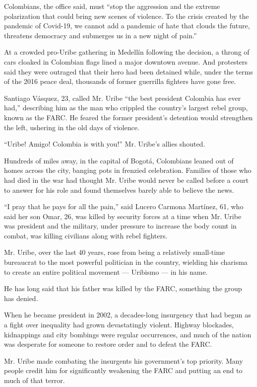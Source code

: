 Colombians, the office said, must ``stop the aggression and the extreme
polarization that could bring new scenes of violence. To the crisis
created by the pandemic of Covid-19, we cannot add a pandemic of hate
that clouds the future, threatens democracy and submerges us in a new
night of pain.''

At a crowded pro-Uribe gathering in Medellín following the decision, a
throng of cars cloaked in Colombian flags lined a major downtown avenue.
And protesters said they were outraged that their hero had been detained
while, under the terms of the 2016 peace deal, thousands of former
guerrilla fighters have gone free.

Santiago Vásquez, 23, called Mr. Uribe ``the best president Colombia has
ever had,'' describing him as the man who crippled the country's largest
rebel group, known as the FARC. He feared the former president's
detention would strengthen the left, ushering in the old days of
violence.

``Uribe! Amigo! Colombia is with you!'' Mr. Uribe's allies shouted.

Hundreds of miles away, in the capital of Bogotá, Colombians leaned out
of homes across the city, banging pots in frenzied celebration. Families
of those who had died in the war had thought Mr. Uribe would never be
called before a court to answer for his role and found themselves barely
able to believe the news.

``I pray that he pays for all the pain,'' said Lucero Carmona Martínez,
61, who said her son Omar, 26, was killed by security forces at a time
when Mr. Uribe was president and the military, under pressure to
increase the body count in combat, was killing civilians along with
rebel fighters.

Mr. Uribe, over the last 40 years, rose from being a relatively
small-time bureaucrat to the most powerful politician in the country,
wielding his charisma to create an entire political movement ---
Uribismo --- in his name.

He has long said that his father was killed by the FARC, something the
group has denied.

When he became president in 2002, a decades-long insurgency that had
begun as a fight over inequality had grown devastatingly violent.
Highway blockades, kidnappings and city bombings were regular
occurrences, and much of the nation was desperate for someone to restore
order and to defeat the FARC.

Mr. Uribe made combating the insurgents his government's top priority.
Many people credit him for significantly weakening the FARC and putting
an end to much of that terror.


